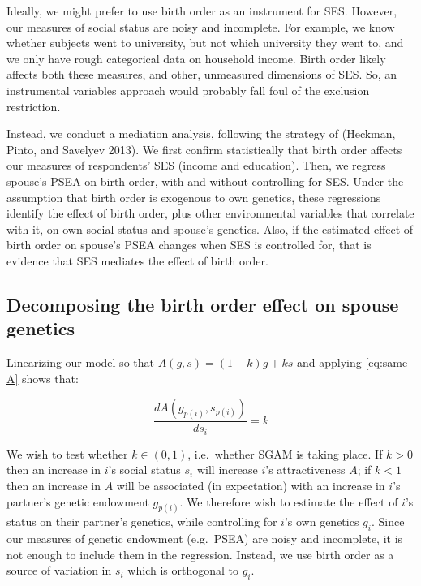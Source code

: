 \documentclass[
]{article}
\begin{document}
Ideally, we might prefer to use birth order as an instrument for SES.
However, our measures of social status are noisy and incomplete. For
example, we know whether subjects went to university, but not which
university they went to, and we only have rough categorical data on
household income. Birth order likely affects both these measures, and
other, unmeasured dimensions of SES. So, an instrumental variables
approach would probably fall foul of the exclusion restriction.

Instead, we conduct a mediation analysis, following the strategy of
(Heckman, Pinto, and Savelyev 2013). We first confirm statistically that birth
order affects our measures of respondents' SES (income and education).
Then, we regress spouse's PSEA on birth order, with and without
controlling for SES. Under the assumption that birth order is exogenous
to own genetics, these regressions identify the effect of birth order,
plus other environmental variables that correlate with it, on own social
status and spouse's genetics. Also, if the estimated effect of birth
order on spouse's PSEA changes when SES is controlled for, that is
evidence that SES mediates the effect of birth order.

\hypertarget{decomposing-the-birth-order-effect-on-spouse-genetics}{%
\subsection{Decomposing the birth order effect on spouse genetics}\label{decomposing-the-birth-order-effect-on-spouse-genetics}}

Linearizing our model so that \(A(g, s) = (1-k)g + ks\) and applying
\eqref{eq:same-A} shows that:

\[
\frac{d A(g_{p(i)}, s_{p(i)})}{d s_i} = k
\]

We wish to test whether \(k \in (0, 1)\), i.e.~whether SGAM is taking
place. If \(k > 0\) then an increase in \(i\)'s social status \(s_i\) will
increase \(i\)'s attractiveness \(A\); if \(k < 1\) then an increase in \(A\)
will be associated (in expectation) with an increase in \(i\)'s partner's
genetic endowment \(g_{p(i)}\). We therefore wish to estimate the effect
of \(i\)'s status on their partner's genetics, while controlling for \(i\)'s
own genetics \(g_i\). Since our measures of genetic endowment (e.g.~PSEA)
are noisy and incomplete, it is not enough to include them in the
regression. Instead, we use birth order as a source of variation in
\(s_i\) which is orthogonal to \(g_i\).
\end{document}
